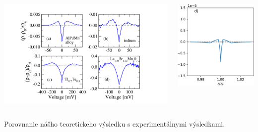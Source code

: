 \documentclass[
	11pt, %
]{beamer}
\begin{document}
\begin{frame}
\begin{columns}[c]
\begin{column}{.5\textwidth}
\includegraphics[scale=0.35]{grafy/B2}
\end{column}
\begin{column}{.5\textwidth}
\qquad
\includegraphics[scale=0.35]{grafy/final}
\end{column}
\end{columns}
Porovnanie nášho teoretickeho výsledku s experimentálnymi výsledkami. 
\end{frame}
\end{document}
